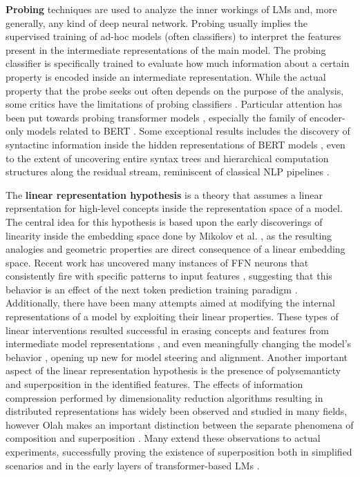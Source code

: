 \textbf{Probing} techniques are used to analyze the inner workings of LMs and, more generally, any kind of deep neural network.
Probing usually implies the supervised training of ad-hoc models (often classifiers) to interpret the features present in the intermediate representations of the main model.
The probing classifier is specifically trained to evaluate how much information about a certain property is encoded inside an intermediate representation.
While the actual property that the probe seeks out often depends on the purpose of the analysis, some critics have  the limitations of probing classifiers \cite{belinkov2022}.
Particular attention has been put towards probing transformer models \cite{chwang2024, zou2023, macdiarmid2024, burns2024}, especially the family of encoder-only models related to BERT \cite{devlin2018}.
Some exceptional results includes the discovery of syntactinc information inside the hidden representations of BERT models \cite{tenney2019a, lin2019, liu2019}, even to the extent of uncovering entire syntax trees \cite{hewitt2019} and hierarchical computation structures along the residual stream, reminiscent of classical NLP pipelines \cite{tenney2019b}.


The \textbf{linear representation hypothesis} \cite{park2023} is a theory that assumes a linear reprsentation for high-level concepts inside the representation space of a model.
The central idea for this hypothesis is based upon the early discoverings of linearity inside the embedding space done by Mikolov et al. \cite{mikolov2013}, as the resulting analogies and geometric properties are direct consequence of a linear embedding space.
Recent work has uncovered many instances of FFN neurons that consistently fire with specific patterns  to input features \cite{voita2023}, suggesting that this behavior is an effect of the next token prediction training paradigm \cite{jiang2024}.
Additionally, there have been many attempts aimed at modifying the internal representations of a model by exploiting their linear properties.
These types of linear interventions resulted successful in erasing concepts and features from intermediate model representations \cite{ravfogel2020, ravfogel2022, belrose2023b}, and even meaningfully changing the model's behavior \cite{nanda2023, belrose2023b}, opening up new  for model steering and alignment. 
Another important aspect of the linear representation hypothesis is the presence of polysemanticty and superposition in the identified features.
The effects of information compression performed by dimensionality reduction algorithms resulting in distributed representations has widely been observed and studied in many fields, however Olah makes an important distinction between the separate phenomena of composition and superposition \cite{olah2023}.
Many extend these observations to actual experiments, successfully proving the existence of superposition both in simplified scenarios \cite{elhage2022, arora2018} and in the early layers of transformer-based LMs \cite{gurnee2023}.

